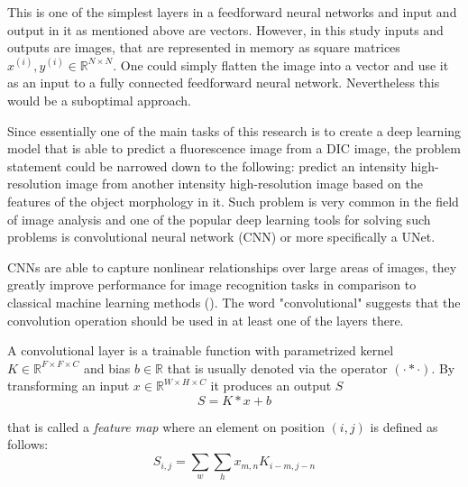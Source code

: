 This is one of the simplest layers in a feedforward neural networks and input and output in it as mentioned above are vectors. However, in this study inputs and outputs are images, that are represented in memory as square matrices $x^{(i)}, y^{(i)} \in \mathbb{R}^{N \times N}$. One could simply flatten the image into a vector and use it as an input to a fully connected feedforward neural network. Nevertheless this would be a suboptimal approach. 

Since essentially one of the main tasks of this research is to create a deep learning model that is able to predict a fluorescence image from a DIC image, the problem statement could be narrowed down to the following: predict an intensity high-resolution image from another intensity high-resolution image based on the features of the object morphology in it. Such problem is very common in the field of image analysis and one of the popular deep learning tools for solving such problems is convolutional neural network (CNN) or more specifically a UNet.

CNNs are able to capture nonlinear relationships over large areas of images, they greatly improve performance for image recognition tasks in comparison to classical machine learning methods (\cite{Ounkomol_2018}). The word "convolutional" suggests that the convolution operation should be used in at least one of the layers there.  

\begin{definition}
	A convolutional layer is a trainable function with parametrized kernel $K \in \mathbb{R}^{F \times F \times C}$ and bias $b \in \mathbb{R}$ that is usually denoted via the operator $(\cdot * \cdot)$. By transforming an input $x \in \mathbb{R}^{W \times H \times C}$ it produces an output $S$
	\begin{equation}
		S = K * x + b
	\end{equation}

	that is called a \textit{feature map} where an element on position $(i, j)$ is defined as follows:
		\begin{equation}
			S_{i, j} = \sum_{w} \sum_{h} x_{m, n}  K_{i - m, j - n}
		\end{equation}
\end{definition}

